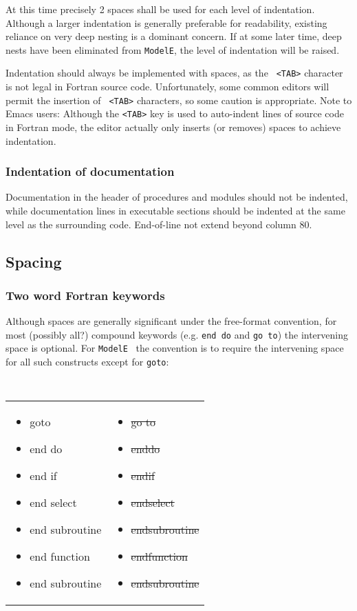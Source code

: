 \documentclass{article}
\newcommand{\ModelE}{{\tt ModelE}}
\begin{document}
\vspace*{0.1in}
At this time precisely 2 spaces shall be used for each level of
indentation.  Although a larger indentation is generally preferable
for readability, existing reliance on very deep nesting is a dominant
concern.  If at some later time, deep nests have been eliminated from
\ModelE, the level of indentation will be raised.

Indentation should always be implemented with spaces, as the {\tt
  <TAB>} character is not legal in Fortran source code.
Unfortunately, some common editors will permit the insertion of {\tt
  <TAB>} characters, so some caution is appropriate.  Note to Emacs
users: Although the {\tt <TAB>} key is used to auto-indent lines of
source code in Fortran mode, the editor actually only inserts (or
removes) spaces to achieve indentation.

\subsubsection {Indentation of documentation}
Documentation in the header of procedures and modules should not be
indented, while documentation lines in executable sections should be
indented at the same level as the surrounding code.  End-of-line not
extend beyond column 80.

\subsection {Spacing}
\subsubsection {Two word Fortran keywords}
Although spaces are generally significant under the free-format
convention, for most (possibly all?) compound keywords (e.g. {\tt end
  do} and {\tt go to}) the intervening space is optional.  For \ModelE~
the convention is to require the intervening space for all such constructs except for {\tt goto}:

\noindent
{\tt
\begin{tabular}[t]{ll}
\parbox[t]{2in}{
\begin{itemize}
\item goto
\item end do
\item end if
\item end select
\item end subroutine
\item end function
\item end subroutine
\end{itemize}} &
\parbox[t]{2in}{
\begin{itemize}
\item \sout{go to}
\item \sout{enddo}
\item \sout{endif}
\item \sout{endselect}
\item \sout{endsubroutine}
\item \sout{endfunction}
\item \sout{endsubroutine}
\end{itemize}}
\end{tabular}
}
\end{document}
